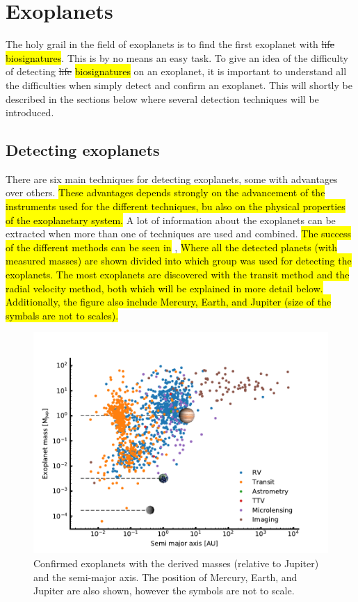 \section{Exoplanets}
\label{sec:exoplanets}

The holy grail in the field of exoplanets is to find the first exoplanet with \st{life}
\hl{biosignatures}. This is by no means an easy task. To give an idea of the difficulty of detecting
\st{life} \hl{biosignatures} on an exoplanet, it is important to understand all the difficulties
when simply detect and confirm an exoplanet. This will shortly be described in the sections below
where several detection techniques will be introduced.

\subsection{Detecting exoplanets}
\label{sec:detecting_exoplanets}

There are six main techniques for detecting exoplanets, some with advantages over others. \hl{These
advantages depends strongly on the advancement of the instruments used for the different techniques,
bu also on the physical properties of the exoplanetary system.} A lot of information about the
exoplanets can be extracted when more than one of techniques are used and combined. \hl{The success
of the different methods can be seen in} , \hl{Where all the detected
planets (with measured masses) are shown divided into which group was used for detecting the
exoplanets. The most exoplanets are discovered with the transit method and the radial velocity
method, both which will be explained in more detail below. Additionally, the figure also include
Mercury, Earth, and Jupiter (size of the symbals are not to scales).}

\begin{figure}[htpb!]
    \centering
    \includegraphics[width=1.0\linewidth]{figures/exoplanetDetectionType.pdf}
    \caption{Confirmed exoplanets with the derived masses (relative to Jupiter) and the semi-major
             axis. The position of Mercury, Earth, and Jupiter are also shown, however the symbols
             are not to scale.}
    \label{fig:detectionTypes}
\end{figure}

